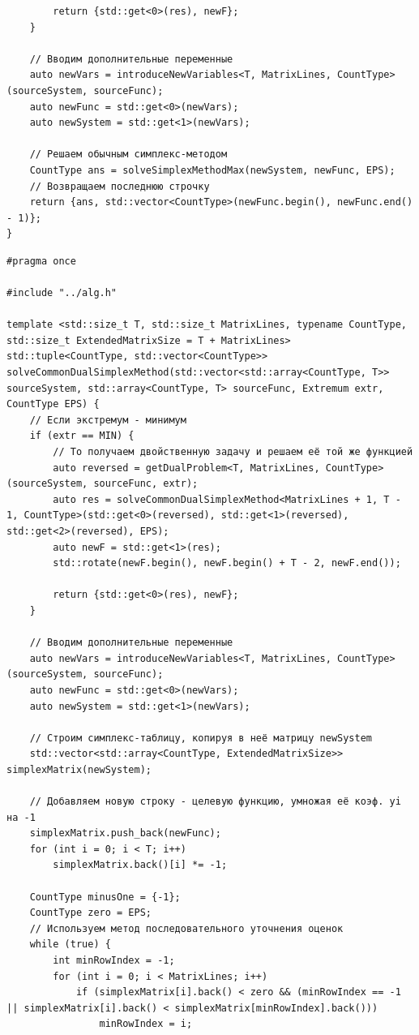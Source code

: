\documentclass[a4paper,14pt]{extarticle}
\begin{document}
\begin{verbatim}
        return {std::get<0>(res), newF};
    }

    // Вводим дополнительные переменные
    auto newVars = introduceNewVariables<T, MatrixLines, CountType>(sourceSystem, sourceFunc);
    auto newFunc = std::get<0>(newVars);
    auto newSystem = std::get<1>(newVars);

    // Решаем обычным симплекс-методом
    CountType ans = solveSimplexMethodMax(newSystem, newFunc, EPS);
    // Возвращаем последнюю строчку
    return {ans, std::vector<CountType>(newFunc.begin(), newFunc.end() - 1)};
}
    \end{verbatim}
\begin{verbatim}
#pragma once 

#include "../alg.h"

template <std::size_t T, std::size_t MatrixLines, typename CountType, std::size_t ExtendedMatrixSize = T + MatrixLines>
std::tuple<CountType, std::vector<CountType>> solveCommonDualSimplexMethod(std::vector<std::array<CountType, T>> sourceSystem, std::array<CountType, T> sourceFunc, Extremum extr, CountType EPS) {
    // Если экстремум - минимум
    if (extr == MIN) {
        // То получаем двойственную задачу и решаем её той же функцией
        auto reversed = getDualProblem<T, MatrixLines, CountType>(sourceSystem, sourceFunc, extr);
        auto res = solveCommonDualSimplexMethod<MatrixLines + 1, T - 1, CountType>(std::get<0>(reversed), std::get<1>(reversed), std::get<2>(reversed), EPS);
        auto newF = std::get<1>(res);
        std::rotate(newF.begin(), newF.begin() + T - 2, newF.end());

        return {std::get<0>(res), newF};
    }

    // Вводим дополнительные переменные
    auto newVars = introduceNewVariables<T, MatrixLines, CountType>(sourceSystem, sourceFunc);
    auto newFunc = std::get<0>(newVars);
    auto newSystem = std::get<1>(newVars);

    // Строим симплекс-таблицу, копируя в неё матрицу newSystem
    std::vector<std::array<CountType, ExtendedMatrixSize>> simplexMatrix(newSystem);
    
    // Добавляем новую строку - целевую функцию, умножая её коэф. yi на -1
    simplexMatrix.push_back(newFunc);
    for (int i = 0; i < T; i++)
        simplexMatrix.back()[i] *= -1;

    CountType minusOne = {-1};
    CountType zero = EPS;
    // Используем метод последовательного уточнения оценок
    while (true) {
        int minRowIndex = -1;
        for (int i = 0; i < MatrixLines; i++)
            if (simplexMatrix[i].back() < zero && (minRowIndex == -1 || simplexMatrix[i].back() < simplexMatrix[minRowIndex].back()))
                minRowIndex = i;
        

\end{verbatim}
\end{document}
